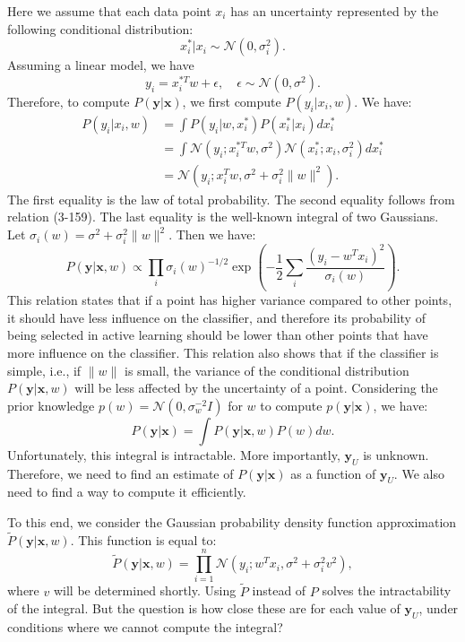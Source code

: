 	Here we assume that each data point $x_i$ has an uncertainty represented by the following conditional distribution:
	\begin{equation}
		x_i^* | x_i \sim \mathcal{N}(0, \sigma_i^2).
	\end{equation}
	Assuming a linear model, we have
	\begin{equation}
		y_i = x_i^{*T} w + \epsilon, \quad \epsilon \sim \mathcal{N}(0, \sigma^2).
	\end{equation}
	Therefore, to compute $P(\mathbf{y}|\mathbf{x})$, we first compute $P(y_i | x_i, w)$. We have:
	\begin{align}
		P(y_i | x_i, w) &= \int P(y_i | w, x_i^*) P(x_i^* | x_i) dx_i^* \\
		&= \int \mathcal{N}(y_i; x_i^{*T} w, \sigma^2) \mathcal{N}(x_i^*; x_i, \sigma_i^2) dx_i^* \\
		&= \mathcal{N}(y_i; x_i^T w, \sigma^2 + \sigma_i^2 \|w\|^2).
	\end{align}
	The first equality is the law of total probability. The second equality follows from relation (3-159). The last equality is the well-known integral of two Gaussians. Let $\sigma_i(w) = \sigma^2 + \sigma_i^2 \|w\|^2$. Then we have:
	\begin{equation}
		P(\mathbf{y}|\mathbf{x}, w) \propto \prod_i \sigma_i(w)^{-1/2} \exp\left( -\frac{1}{2} \sum_i \frac{(y_i - w^T x_i)^2}{\sigma_i(w)} \right).
	\end{equation}
	This relation states that if a point has higher variance compared to other points, it should have less influence on the classifier, and therefore its probability of being selected in active learning should be lower than other points that have more influence on the classifier. This relation also shows that if the classifier is simple, i.e., if $\|w\|$ is small, the variance of the conditional distribution $P(\mathbf{y}|\mathbf{x}, w)$ will be less affected by the uncertainty of a point. Considering the prior knowledge $p(w) = \mathcal{N}(0, \sigma_w^{-2} I)$ for $w$ to compute $p(\mathbf{y}|\mathbf{x})$, we have:
	\begin{equation}
		P(\mathbf{y}|\mathbf{x}) = \int P(\mathbf{y}|\mathbf{x}, w) P(w) dw.
	\end{equation}
	Unfortunately, this integral is intractable. More importantly, $\mathbf{y}_U$ is unknown. Therefore, we need to find an estimate of $P(\mathbf{y}|\mathbf{x})$ as a function of $\mathbf{y}_U$. We also need to find a way to compute it efficiently.
	
	To this end, we consider the Gaussian probability density function approximation $\tilde{P}(\mathbf{y}|\mathbf{x}, w)$. This function is equal to:
	\begin{equation}
		\tilde{P}(\mathbf{y}|\mathbf{x}, w) = \prod_{i=1}^{n} \mathcal{N}(y_i; w^T x_i, \sigma^2 + \sigma_i^2 v^2),
	\end{equation}
	where $v$ will be determined shortly. Using $\tilde{P}$ instead of $P$ solves the intractability of the integral. But the question is how close these are for each value of $\mathbf{y}_U$, under conditions where we cannot compute the integral?
	

